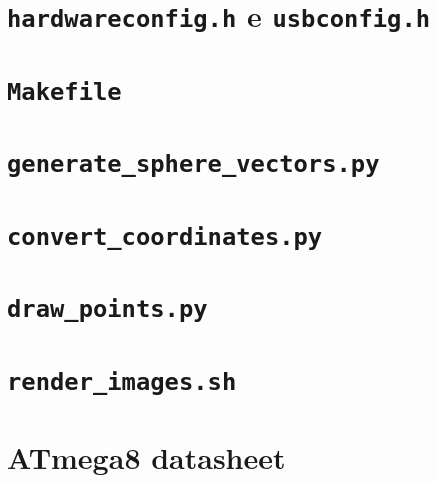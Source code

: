 \documentclass[brazil,pagestart=firstchapter]{abnt}
\begin{document}
\chapter{\texttt{hardwareconfig.h} e \texttt{usbconfig.h}}
\label{ape:usbconfig}

\clearpage


\chapter{\texttt{Makefile}}
\label{ape:makefile}


%
%


\chapter{\texttt{generate\_sphere\_vectors.py}}
\label{ape:generate_sphere_vectors}


\chapter{\texttt{convert\_coordinates.py}}
\label{ape:convert_coordinates}


\chapter{\texttt{draw\_points.py}}
\label{ape:draw_points}


\chapter{\texttt{render\_images.sh}}
\label{ape:render_images}



\anexo


\chapter{ATmega8 datasheet}
\label{anx:atmega8_datasheet}
\end{document}
